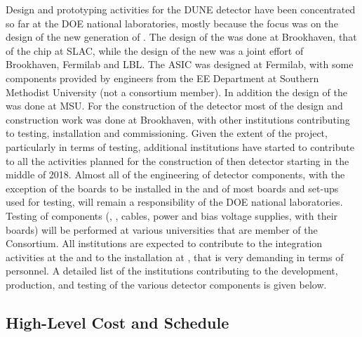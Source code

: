 Design and prototyping activities for the  DUNE detector have 
been concentrated so far at the DOE national laboratories, mostly
because the focus was on the design of the new generation of 
. The design of the   was
done at Brookhaven, that of the  chip at SLAC, while the
design of the new  was a joint effort of Brookhaven,
Fermilab and LBL. The  ASIC was designed at Fermilab, with
some components provided by engineers from the EE Department
at Southern Methodist University (not a consortium member).
In addition the design of the  was done at MSU.
For the construction of the  detector most of the
design and construction work was done at Brookhaven, with other
institutions contributing to testing, installation and
commissioning. Given the extent of the project, particularly in
terms of testing, additional institutions have started to contribute
to all the activities planned for the construction of then 
 detector starting in the middle of 2018. Almost all
of the engineering of detector components, with the exception
of the boards to be installed in the  and of
most boards and set-ups used for testing, will remain a responsibility
of the DOE national laboratories. Testing of components
(, , cables, power and bias voltage supplies,
 with their boards) will be performed at various
universities that are member of the Consortium. All institutions
are expected to contribute to the integration activities at
the  and to the installation at \surf, that is very
demanding in terms of personnel. A detailed list of the 
institutions contributing to the development, production, and
testing of the various detector components is given below.

\subsection{High-Level Cost and Schedule}
\label{sec:fdsp-tpcelec-management-cost}



